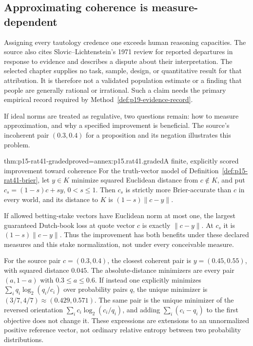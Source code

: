 \subsection{Approximating coherence is measure-dependent}

Assigning every tautology credence one exceeds human reasoning
capacities. The source also cites Slovic--Lichtenstein's 1971 review for
reported departures in response to evidence and describes a dispute
about their interpretation. The selected chapter supplies no task,
sample, design, or quantitative result for that attribution. It is
therefore not a validated population estimate or a finding that people
are generally rational or irrational. Such a claim needs the primary
empirical record required by Method~\ref{def:p19-evidence-record}.

If ideal norms are treated as regulative, two questions remain: how to
measure approximation, and why a specified improvement is beneficial.
The source's incoherent pair \((0.3,0.4)\) for a proposition and its
negation illustrates this problem.

\begin{hbtheorem}{thm:p15-rat41-graded}{proved=annex:p15.rat41.graded}{A finite, explicitly scored improvement toward coherence}
For the truth-vector model of Definition~\ref{def:p15-rat41-brier},
let \(y\in K\) minimize squared Euclidean distance from \(c\notin K\),
and put \(c_s=(1-s)c+sy\), \(0<s\leq1\). Then \(c_s\) is strictly
more Brier-accurate than \(c\) in every world, and its distance to
\(K\) is \((1-s)\|c-y\|\).

If allowed betting-stake vectors have Euclidean norm at most one,
the largest guaranteed Dutch-book loss at quote vector \(c\) is
exactly \(\|c-y\|\). At \(c_s\) it is \((1-s)\|c-y\|\).
Thus the improvement has both benefits under these declared measures
and this stake normalization, not under every conceivable measure.

For the source pair \(c=(0.3,0.4)\), the closest coherent pair is
\(y=(0.45,0.55)\), with squared distance \(0.045\).
The absolute-distance minimizers are every pair \((a,1-a)\) with
\(0.3\leq a\leq0.6\). If instead one explicitly minimizes
\(\sum_i q_i\log_2(q_i/c_i)\) over probability pairs \(q\), the
unique minimizer is \((3/7,4/7)\approx(0.429,0.571)\). The same pair is
the unique minimizer of the reversed orientation
\(\sum_i c_i\log_2(c_i/q_i)\), and adding \(\sum_i(c_i-q_i)\) to the
first objective does not change it. These expressions are extensions to
an unnormalized positive reference vector, not ordinary relative
entropy between two probability distributions.
\end{hbtheorem}

